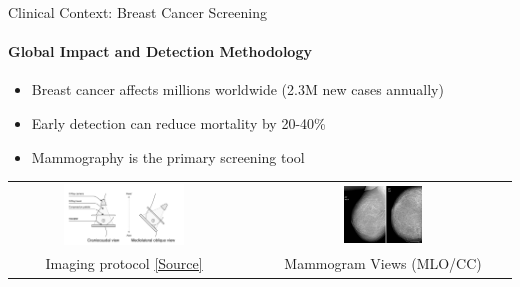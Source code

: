 \documentclass[8pt,aspectratio=169,xcolor=dvipsnames]{beamer}
\begin{document}
\begin{frame}{Clinical Context: Breast Cancer Screening}
    \framesubtitle{Global Impact and Detection Methodology}
    
    \begin{itemize}
        \item Breast cancer affects millions worldwide (2.3M new cases annually)
        \item Early detection can reduce mortality by 20-40\%
        \item Mammography is the primary screening tool
    \end{itemize}
    \begin{center}
    \begin{tabular}{ccc}
    \includegraphics[width=0.55\textwidth]{mammograph.png} &\quad& \includegraphics[width=0.32\textwidth]{mammogram.png} \\
    Imaging protocol \href{https://theses.hal.science/tel-03677490v1/file/M_TARDY.pdf}{[Source]} &\quad& Mammogram Views (MLO/CC) \\
    \end{tabular}
    \end{center}
\end{frame}
\end{document}

